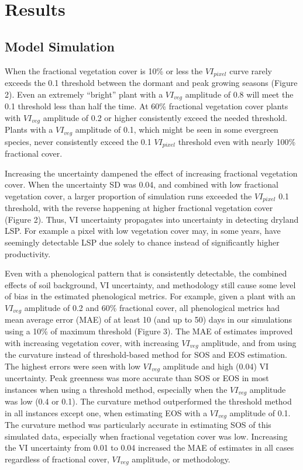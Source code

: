 \documentclass{article}
\begin{document}
\section{Results}

\subsection{Model Simulation}

When the fractional vegetation cover is 10\% or less the $VI_{pixel}$ curve rarely exceeds the 0.1 threshold between the dormant and peak growing seasons (Figure 2). Even an extremely “bright” plant with a $VI_{veg}$ amplitude of 0.8 will meet the 0.1 threshold less than half the time. At 60\% fractional vegetation cover plants with $VI_{veg}$ amplitude of 0.2 or higher consistently exceed the needed threshold. Plants with a $VI_{veg}$ amplitude of 0.1, which might be seen in some evergreen species, never consistently exceed the 0.1 $VI_{pixel}$ threshold even with nearly 100\% fractional cover.

Increasing the uncertainty dampened the effect of increasing fractional vegetation cover. When the uncertainty SD was 0.04, and combined with low fractional vegetation cover, a larger proportion of simulation runs exceeded the $VI_{pixel}$ 0.1 threshold, with the reverse happening at higher fractional vegetation cover (Figure 2). Thus, VI uncertainty propagates into uncertainty in detecting dryland LSP. For example a pixel with low vegetation cover may, in some years, have seemingly detectable LSP due solely to chance instead of significantly higher productivity. 

Even with a phenological pattern that is consistently detectable, the combined effects of soil background, VI uncertainty, and methodology still cause some level of bias in the estimated phenological metrics. For example, given a plant with an $VI_{veg}$ amplitude of 0.2 and 60\% fractional cover, all phenological metrics had mean average error (MAE) of at least 10 (and up to 50) days in our simulations using a 10\% of maximum threshold (Figure 3). The MAE of estimates improved with increasing vegetation cover, with increasing $VI_{veg}$ amplitude, and from using the curvature instead of threshold-based method for SOS and EOS estimation. The highest errors were seen with low $VI_{veg}$ amplitude and high (0.04) VI uncertainty. Peak greenness was more accurate than SOS or EOS in most instances when using a threshold method, especially when the $VI_{veg}$ amplitude was low (0.4 or 0.1). The curvature method outperformed the threshold method in all instances except one, when estimating EOS with a $VI_{veg}$ amplitude of 0.1. The curvature method was particularly accurate in estimating SOS of this simulated data, especially when fractional vegetation cover was low. Increasing the VI uncertainty from 0.01 to 0.04 increased the MAE of estimates in all cases regardless of fractional cover, $VI_{veg}$ amplitude, or methodology.
\end{document}
